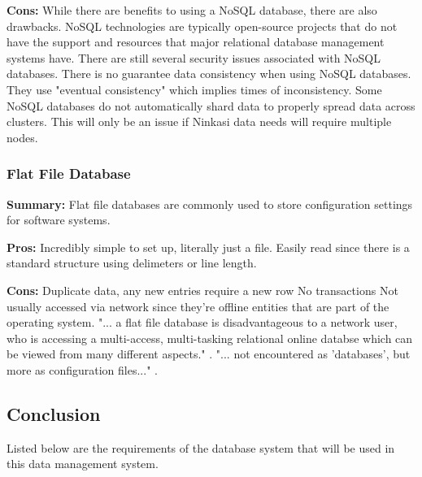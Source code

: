 \documentclass[draftclsnofoot,onecolumn,letterpaper,10pt,compsoc]{IEEEtran}
\begin{document}
		        \noindent \textbf{Cons:}
		            While there are benefits to using a NoSQL database, there are also drawbacks.
		            NoSQL technologies are typically open-source projects that do not have the support and resources that major relational database management systems have\cite{NoSQLProsCons}.
		            There are still several security issues associated with NoSQL databases\cite{NoSQLSecurityIssues}.
		            There is no guarantee data consistency when using NoSQL databases\cite{ChannelFutures}.
		            They use "eventual consistency" which implies times of inconsistency.
		            Some NoSQL databases do not automatically shard data to properly spread data across clusters\cite{ChannelFutures}.
		            This will only be an issue if Ninkasi data needs will require multiple nodes.


  			\subsubsection{Flat File Database}
		        \textbf{Summary:}
		            Flat file databases are commonly used to store configuration settings for software systems.

		        \noindent \textbf{Pros:}
		            Incredibly simple to set up, literally just a file.
		            Easily read since there is a standard structure using delimeters or line length.

		        \noindent \textbf{Cons:}
		            Duplicate data, any new entries require a new row
		            No transactions
		            Not usually accessed via network since they're offline entities that are part of the operating system\cite{Techwalla}.
		            "... a flat file database is disadvantageous to a network user, who is accessing a multi-access, multi-tasking relational online databse which can be viewed from many different aspects." \cite{Techwalla}.
		            "... not encountered as 'databases', but more as configuration files..." \cite{Techwalla}.

		    \subsection{Conclusion}
		        Listed below are the requirements of the database system that will be used in this data management system.
\end{document}
